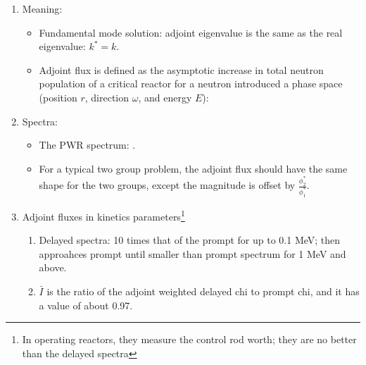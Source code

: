 \documentclass{school-22.211-notes}
\begin{document}
\begin{enumerate}
  \item Meaning:
    \begin{itemize}
    \item Fundamental mode solution: adjoint eigenvalue is the same as the real eigenvalue: $k^* = k$. 
    \item Adjoint flux is defined as the asymptotic increase in total neutron population of a critical reactor for a neutron introduced a phase space (position $r$, direction $\omega$, and energy $E$): 
    \end{itemize}

  \item Spectra: 
    \begin{itemize}
    \item The PWR spectrum: . 
    \item For a typical two group problem, the adjoint flux should have the same shape for the two groups, except the magnitude is offset by $\frac{\phi_2^*}{\phi_1^*}$. 
    \end{itemize}

\item Adjoint fluxes in kinetics parameters\footnote{In operating reactors, they measure the control rod worth; they are no better than the delayed spectra}
  \begin{enumerate}
  \item Delayed spectra: 10 times that of the prompt for up to 0.1 MeV; then approahces prompt until smaller than prompt spectrum for 1 MeV and above. 

  \item $\bar{I}$ is the ratio of the adjoint weighted delayed chi to prompt chi, and it has a value of about 0.97.
  \end{enumerate}

\end{enumerate}
\end{document}
